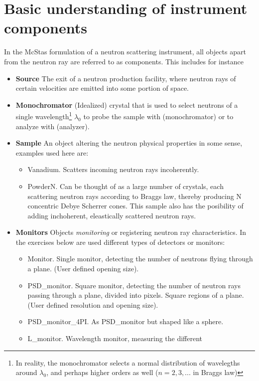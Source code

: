 \section{Basic understanding of instrument components}
In the McStas formulation of a neutron scattering instrument, all
objects apart from the neutron ray are referred to as components. This
includes for instance
\begin{itemize}
\item{{\bf Source} The exit of a neutron production facility, where
    neutron rays of certain velocities are emitted into some
    portion of space.}
\item{{\bf Monochromator} (Idealized) crystal that is used to select
    neutrons of a single wavelength\footnote{In reality,
    the monochromator selects a normal distribution of wavelegths
    around $\lambda_0$, and perhaps higher orders as well ($n=2,3,...$
    in Braggs law)} $\lambda_0$ to probe the sample with (monochromator) or to 
    analyze with (analyzer).}
\item{{\bf Sample} An object altering the neutron physical properties
    in some sense, examples used here are:}
  \begin{itemize}
    \item{Vanadium. Scatters incoming neutron rays incoherently.}
    \item{PowderN. Can be thought of as a large number of crystals,
        each scattering neutron rays according to Braggs law, thereby
        producing N concentric Debye Scherrer cones. This sample also
        has the posibility of adding inchoherent, eleastically scattered
        neutron rays.}
    \end{itemize}
\item{{\bf Monitors} Objects \emph{monitoring} or registering neutron ray
    characteristics. In the exercises below are used different types
    of detectors or monitors:}
  \begin{itemize}
    \item{Monitor. Single monitor, detecting the number of neutrons flying
        through a plane. (User defined opening size).}
    \item{PSD\_monitor. Square monitor, detecting the number of
        neutron rays passing through a plane, divided into
        pixels. Square regions of a plane. (User defined resolution 
        and opening size).}
    \item{PSD\_monitor\_4PI. As PSD\_monitor but shaped like a sphere.}
    \item{L\_monitor. Wavelength monitor, measuring the different
}
\end{itemize}
\end{itemize}
